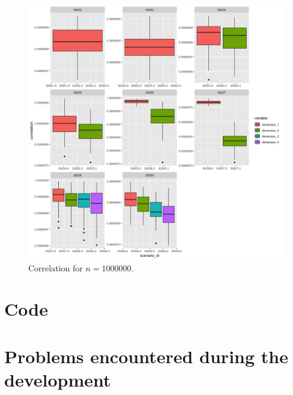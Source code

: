 \documentclass[11pt]{report}
\begin{document}
\begin{figure}[ht]
\centering
    \includegraphics[scale = 1.5]{./images/fast_correlation_1000000.png}
    \caption{Correlation for $n = 1000000$.}
    \label{fast_correlation_1000000}
\end{figure}


\chapter{Code}
\label{chap:code}

\chapter{Problems encountered during the development}
\end{document}
